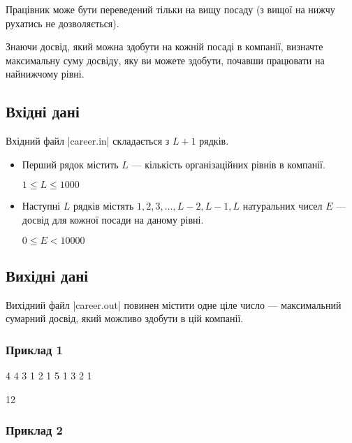 \documentclass[12pt,a4paper]{article}
\begin{document}
Працівник може бути переведений тільки на вищу посаду (з вищої на нижчу рухатись не дозволяється).

Знаючи досвід, який можна здобути на кожній посаді в компанії, визначте максимальну суму досвіду, яку ви можете здобути, почавши працювати на найнижчому рівні.


\subsection*{Вхідні дані}

Вхідний файл |career.in| складається з \(L + 1\) рядків.

\begin{itemize}
    \item Перший рядок містить \(L\) --- кількість організаційних рівнів в компанії.

          \(1 \leq L \leq 1000\)

    \item Наступні \(L\) рядків містять \(1, 2, 3, ..., L-2, L-1, L\) натуральних чисел \(E\) --- досвід для кожної посади на даному рівні.

          \(0 \leq E < 10000\)
\end{itemize}


\subsection*{Вихідні дані}

Вихідний файл |career.out| повинен містити одне ціле число --- максимальний сумарний досвід, який можливо здобути в цій компанії.


\pagebreak


\subsubsection*{Приклад 1}

\textbf{}

\begin{codeblock}
4
4
3 1
2 1 5
1 3 2 1
\end{codeblock}

\textbf{}

\begin{codeblock}
12
\end{codeblock}


\subsubsection*{Приклад 2}
\end{document}
